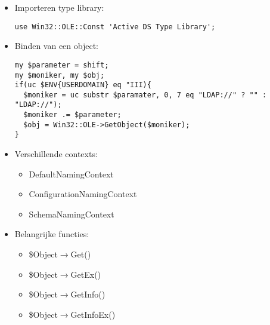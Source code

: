 \documentclass{report}
\begin{document}
\lstset{language=perl, showstringspaces=false}
\begin{itemize}
    \item Importeren type library:
    \begin{lstlisting}
use Win32::OLE::Const 'Active DS Type Library';
    \end{lstlisting}
    \item Binden van een object:
    \begin{lstlisting}
my $parameter = shift;
my $moniker, my $obj;
if(uc $ENV{USERDOMAIN} eq "III){
  $moniker = uc substr $paramater, 0, 7 eq "LDAP://" ? "" : "LDAP://");
  $moniker .= $parameter;
  $obj = Win32::OLE->GetObject($moniker);
}
    \end{lstlisting}

    \item Verschillende contexts:
    \begin{itemize}
        \item DefaultNamingContext
        \item ConfigurationNamingContext
        \item SchemaNamingContext
    \end{itemize}

    \item Belangrijke functies:
    \begin{itemize}
        \item \$Object$\rightarrow$Get()
        \item \$Object$\rightarrow$GetEx()
        \item \$Object$\rightarrow$GetInfo()
        \item \$Object$\rightarrow$GetInfoEx()
    \end{itemize}
\end{itemize}
\end{document}
